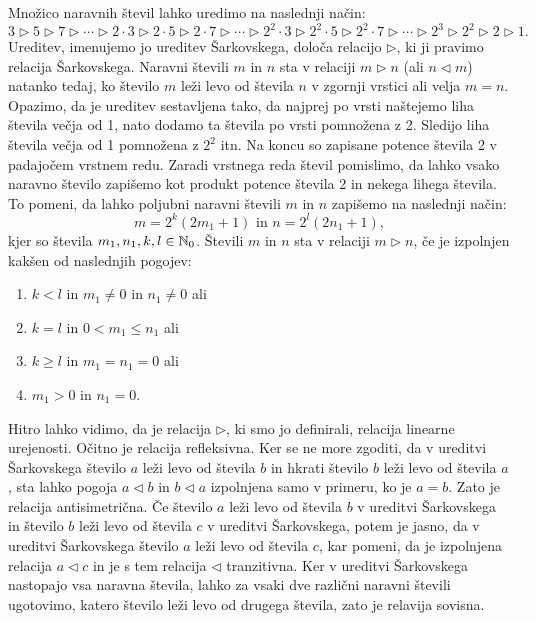 \documentclass[../TG_magistrsko_delo_sections.tex]{subfiles}
\begin{document}
\begin{definicija}\label{def:ureditev-sark}
Množico naravnih števil lahko uredimo na naslednji način:
$$3 \triangleright 5 \triangleright 7 \triangleright \cdots \triangleright 2\cdot 3 \triangleright 2\cdot 5 \triangleright 2\cdot 7 \triangleright \cdots \triangleright 2^2\cdot 3 \triangleright 2^2\cdot 5 \triangleright 2^2\cdot 7 \triangleright \cdots \triangleright 2^3 \triangleright 2^2 \triangleright 2 \triangleright 1.$$
Ureditev, imenujemo jo ureditev Šarkovskega, določa relacijo $\triangleright$, ki ji pravimo relacija Šarkovskega. Naravni števili $m$ in $n$ sta v relaciji $m\triangleright n$ (ali $n \triangleleft m$) natanko tedaj, ko število $m$ leži levo od števila $n$ v zgornji vrstici ali velja $m=n$. Opazimo, da je ureditev sestavljena tako, da najprej po vrsti naštejemo liha števila večja od 1, nato dodamo ta števila po vrsti pomnožena z 2. Sledijo liha števila večja od 1 pomnožena z $2^2$ itn. Na koncu so zapisane potence števila 2 v padajočem vrstnem redu. Zaradi vrstnega reda števil pomislimo, da lahko vsako naravno število zapišemo kot produkt potence števila 2 in nekega lihega števila. To pomeni, da lahko poljubni naravni števili $m$ in $n$ zapišemo na naslednji način: 
\begin{equation}
m= 2^k(2m_1 +1)\text{ in } n= 2^l(2n_1 +1), \label{eq:zapis}
\end{equation}
 kjer so števila $m_1, n_1, k, l \in \mathbb N_0$. Števili $m$ in $n$ sta v relaciji $m \triangleright n$, če je izpolnjen kakšen od naslednjih pogojev:
\begin{enumerate}[label={(R\arabic*)}]
\item $k<l$ in $m_1 \neq 0$ in $n_1 \neq 0$ ali \label{rel1}
\item $k=l$ in $0<m_1 \leq n_1$ ali \label{rel2}
\item $k \geq l$ in $m_1 = n_1=0$ ali \label{rel3}
\item $m_1>0$ in $n_1 =0$. \label{rel4}
\end{enumerate}
\end{definicija}

\begin{opomba}
Hitro lahko vidimo, da je relacija $\triangleright$, ki smo jo definirali, relacija linearne urejenosti. Očitno je relacija refleksivna. Ker se ne more zgoditi, da v ureditvi Šarkovskega število $a$ leži levo od števila $b$ in hkrati število $b$ leži levo od števila $a$, sta lahko pogoja $a \triangleleft b$ in $b \triangleleft a$ izpolnjena samo v primeru, ko je $a = b$. Zato je relacija antisimetrična. Če število $a$ leži levo od števila $b$ v ureditvi Šarkovskega in število $b$ leži levo od števila $c$ v ureditvi Šarkovskega, potem je jasno, da v ureditvi Šarkovskega število $a$ leži levo od števila $c$, kar pomeni, da je izpolnjena relacija $a \triangleleft c$ in je s tem relacija $\triangleleft$ tranzitivna. Ker v ureditvi Šarkovskega nastopajo vsa naravna števila, lahko za vsaki dve različni naravni števili ugotovimo, katero število leži levo od drugega števila, zato je relavija sovisna.
\end{opomba}
\end{document}

